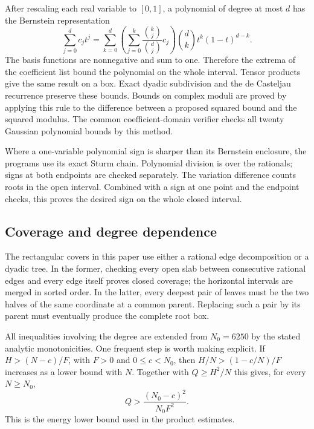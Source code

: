 After rescaling each real variable to $[0,1]$, a polynomial of
degree at most $d$ has the Bernstein representation
\[
 \sum_{j=0}^dc_jt^j
 =\sum_{k=0}^d\left(\sum_{j=0}^k
           \frac{\binom{k}{j}}{\binom{d}{j}}c_j\right)
          \binom{d}{k}t^k(1-t)^{d-k}.
\]
The basis functions are nonnegative and sum to one. Therefore
the extrema of the coefficient list bound the polynomial
on the whole interval. Tensor products give the same result
on a box. Exact dyadic subdivision and the de Casteljau
recurrence preserve these bounds. Bounds on complex moduli
are proved by applying this rule to the difference between
a proposed squared bound and the squared modulus.
The common coefficient-domain verifier checks all twenty
Gaussian polynomial bounds by this method.

Where a one-variable polynomial sign is sharper than its
Bernstein enclosure, the programs use its exact Sturm chain.
Polynomial division is over the rationals; signs at both
endpoints are checked separately. The variation difference
counts roots in the open interval. Combined with a sign at
one point and the endpoint checks, this proves the desired
sign on the whole closed interval.

\subsection{Coverage and degree dependence}

The rectangular covers in this paper use either a rational
edge decomposition or a dyadic tree. In the former, checking
every open slab between consecutive rational edges and every
edge itself proves closed coverage; the horizontal intervals
are merged in sorted order. In the latter, every deepest
pair of leaves must be the two halves of the same coordinate
at a common parent. Replacing such a pair by its parent
must eventually produce the complete root box.

All inequalities involving the degree are extended from
$N_0=6250$ by the stated analytic monotonicities. One
frequent step is worth making explicit. If
$H>(N-c)/F$, with $F>0$ and $0\le c<N_0$, then
$H/N>(1-c/N)/F$ increases as a lower bound with $N$.
Together with $Q\ge H^2/N$ this gives, for every $N\ge N_0$,
\[
 Q>\frac{(N_0-c)^2}{N_0F^2}.
\]
This is the energy lower bound used in the product estimates.

